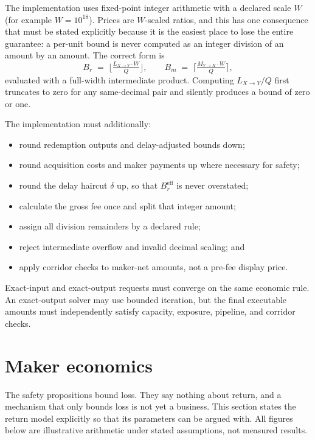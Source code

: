 \documentclass[10pt,twocolumn]{article}
\theoremstyle{definition}
\newcommand{\Lb}{L_{X\to Y}}
\newcommand{\Mb}{M_{Y\to X}}
\newcommand{\Br}{B_{r}}
\newcommand{\Bre}{B_{r}^{\mathrm{eff}}}
\newcommand{\Bm}{B_{m}}
\begin{document}
The implementation uses fixed-point integer arithmetic with a declared scale $W$ (for example $W = 10^{18}$).
Prices are $W$-scaled ratios, and this has one consequence that must be stated explicitly because it is the
easiest place to lose the entire guarantee: a per-unit bound is never computed as an integer division of an amount
by an amount. The correct form is
\[
  \Br \;=\; \Big\lfloor \tfrac{\Lb \cdot W}{Q} \Big\rfloor, \qquad
  \Bm \;=\; \Big\lceil  \tfrac{\Mb \cdot W}{Q} \Big\rceil,
\]
evaluated with a full-width intermediate product. Computing $\Lb / Q$ first truncates to zero for any same-decimal
pair and silently produces a bound of zero or one.

The implementation must additionally:

\begin{itemize}[label=--]
  \item round redemption outputs and delay-adjusted bounds down;
  \item round acquisition costs and maker payments up where necessary for safety;
  \item round the delay haircut $\delta$ up, so that $\Bre$ is never overstated;
  \item calculate the gross fee once and split that integer amount;
  \item assign all division remainders by a declared rule;
  \item reject intermediate overflow and invalid decimal scaling; and
  \item apply corridor checks to maker-net amounts, not a pre-fee display price.
\end{itemize}

Exact-input and exact-output requests must converge on the same economic rule. An exact-output solver may use
bounded iteration, but the final executable amounts must independently satisfy capacity, exposure, pipeline, and
corridor checks.

\section{Maker economics}
\label{sec:econ}

The safety propositions bound loss. They say nothing about return, and a mechanism that only bounds loss is not
yet a business. This section states the return model explicitly so that its parameters can be argued with. All
figures below are illustrative arithmetic under stated assumptions, not measured results.
\end{document}
